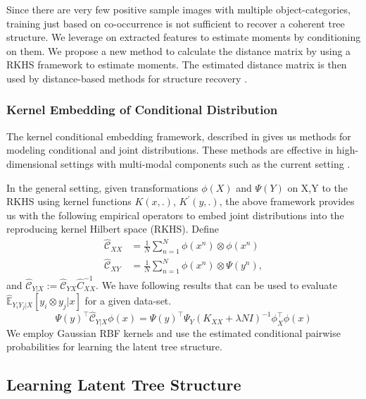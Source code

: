 \documentclass{article}
\begin{document}
Since there are very few positive sample images with multiple object-categories, training just based on co-occurrence is not sufficient to recover a coherent tree structure. We  leverage on extracted features to estimate moments by conditioning on them. We propose a new method to calculate the distance matrix by using a RKHS framework to estimate moments. The estimated distance matrix is then used by distance-based methods for structure recovery \cite{LTM}.









\subsubsection*{Kernel Embedding of Conditional Distribution}
The kernel conditional embedding framework, described in \cite{song} gives us methods for modeling conditional and joint distributions.
These methods are effective in high-dimensional settings with multi-modal components such as the current setting .

In the general setting, given transformations $\phi(X)$ and $\Psi(Y)$ on X,Y to the RKHS using kernel functions $K(x,.)$, $K^{'}(y,.)$, the above framework provides us with the following empirical operators to embed joint distributions into the reproducing kernel Hilbert space (RKHS). Define
\begin{align*}
   \hat{\mathcal{C}}_{XX} &= \frac{1}{N} \sum_{n=1}^N\phi(x^{n})\otimes \phi(x^{n}) \\
  \hat{\mathcal{C}}_{XY} &= \frac{1}{N}  \sum_{n=1}^N\phi(x^{n})\otimes \Psi(y^{n}),
\end{align*} and $\hat{\mathcal{C}}_{Y|X} := \hat{\mathcal{C}}_{YX}\hat{C}_{XX}^{-1} $.
We have following results that can be used to evaluate $\hat{\mathbb{E}}_{Y_{i}Y_{j}|X}[y_{i} \otimes y_{j}|x]$ for a given data-set.
  \begin{equation}
 \Psi(y)^{\top}\hat{\mathcal{C}}_{Y|X} \phi(x) = \Psi (y)^{\top} \Psi_{Y} ( K_{XX} + \lambda N I)^{-1} \phi _{X}^{\top} \phi(x)
\end{equation} We employ Gaussian RBF kernels and use the estimated conditional pairwise probabilities for learning the latent tree structure.

 \subsection{Learning Latent Tree Structure}
\end{document}
